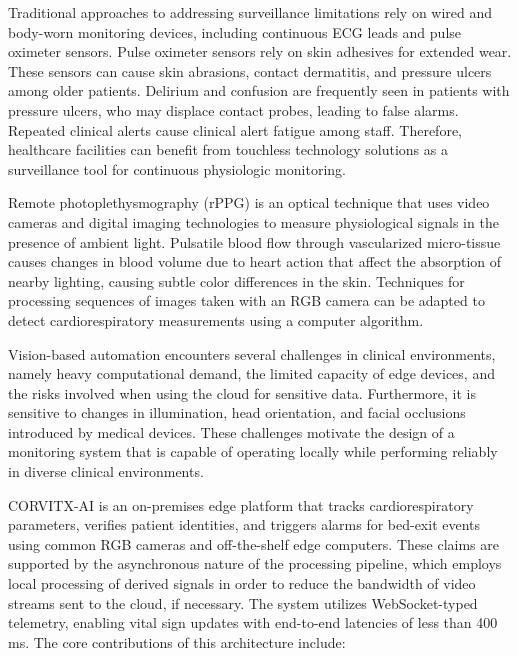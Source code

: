 \documentclass[conference]{IEEEtran}
\begin{document}
Traditional approaches to addressing surveillance limitations rely on wired and body-worn monitoring devices, including continuous ECG leads and pulse oximeter sensors. Pulse oximeter sensors rely on skin adhesives for extended wear. These sensors can cause skin abrasions, contact dermatitis, and pressure ulcers among older patients. Delirium and confusion are frequently seen in patients with pressure ulcers, who may displace contact probes, leading to false alarms. Repeated clinical alerts cause clinical alert fatigue among staff. Therefore, healthcare facilities can benefit from touchless technology solutions as a surveillance tool for continuous physiologic monitoring.

Remote photoplethysmography (rPPG) is an optical technique that uses video cameras and digital imaging technologies to measure physiological signals in the presence of ambient light. Pulsatile blood flow through vascularized micro-tissue causes changes in blood volume due to heart action that affect the absorption of nearby lighting, causing subtle color differences in the skin. Techniques for processing sequences of images taken with an RGB camera can be adapted to detect cardiorespiratory measurements using a computer algorithm.

Vision-based automation encounters several challenges in clinical environments, namely heavy computational demand, the limited capacity of edge devices, and the risks involved when using the cloud for sensitive data. Furthermore, it is sensitive to changes in illumination, head orientation, and facial occlusions introduced by medical devices. These challenges motivate the design of a monitoring system that is capable of operating locally while performing reliably in diverse clinical environments.

CORVITX-AI is an on-premises edge platform that tracks cardiorespiratory parameters, verifies patient identities, and triggers alarms for bed-exit events using common RGB cameras and off-the-shelf edge computers. These claims are supported by the asynchronous nature of the processing pipeline, which employs local processing of derived signals in order to reduce the bandwidth of video streams sent to the cloud, if necessary. The system utilizes WebSocket-typed telemetry, enabling vital sign updates with end-to-end latencies of less than 400\,ms. The core contributions of this architecture include:
\end{document}
